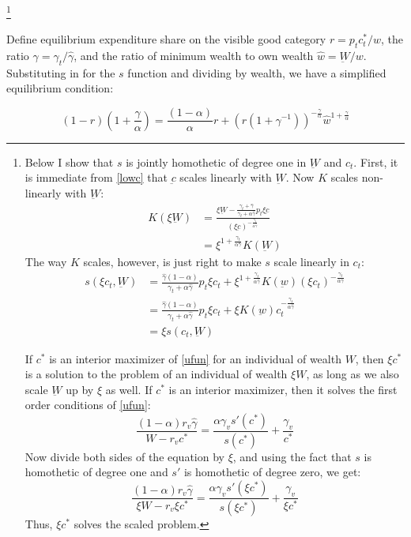 \documentclass[12pt]{article}
\begin{document}
\footnote{
Below I show that $s$ is jointly homothetic of degree one in $\underbar{W}$ and $c_t$.  First, it is immediate from \eqref{lowc} that $\underbar{c}$ scales linearly with $\underbar{W}$.
Now $K$ scales non-linearly with $\underbar{W}$:
\begin{align*}
	K(\xi\underbar{W}) &= \frac{\xi\underbar{W}- \frac{\gamma_t + \hat{\gamma}}{\gamma_t + \alpha \hat{\gamma}}p_t \xi \underbar{c}}{(\xi\underbar{c})^{-\frac{\gamma_t}{\alpha \hat{\gamma}}}} \\
	&= \xi^{1 + \frac{\gamma_t}{\alpha \hat{\gamma}}}K(\underbar{W})
\end{align*}
The way $K$ scales, however, is just right to make $s$ scale linearly in $c_t$:
\begin{align*}
	s(\xi c_t,\underbar{W}) &= \frac{\hat{\gamma}\left(1-\alpha\right)}{\gamma_t +\alpha \hat{\gamma}} p_t \xi c_t + \xi^{1+\frac{\gamma_t}{\alpha \hat{\gamma}}} K(\underbar{w}) (\xi c_t)^{-\frac{\gamma_t}{\alpha \hat{\gamma}}} \\
	&= \frac{\hat{\gamma}\left(1-\alpha\right)}{\gamma_t +\alpha \hat{\gamma}} p_t \xi c_t + \xi K(\underbar{w}) c_t^{-\frac{\gamma_t}{\alpha \hat{\gamma}}} \\
	&= \xi s(c_t,\underbar{W})
\end{align*}

If $c^*$ is an interior maximizer of \eqref{ufun} for an individual of wealth $W$, then $\xi c^*$ is a solution to the  problem of an individual of wealth $\xi W$, as long as we also scale $\underbar{W}$ up by $\xi$ as well.
If $c^*$ is an interior maximizer, then it solves the first order conditions of \eqref{ufun}:
\[
\frac{(1-\alpha)r_v \hat{\gamma}}{W-r_v c^*} = \frac{\alpha \gamma_v s'(c^*)}{s(c^*)} + \frac{\gamma_v}{c^*}
\]
Now divide both sides of the equation by $\xi$, and using the fact that $s$ is homothetic of degree one and $s'$ is homothetic of degree zero, we get:
\[
\frac{(1-\alpha)r_v \hat{\gamma}}{\xi W-r_v \xi c^*} = \frac{\alpha \gamma_v s'(\xi c^*)}{s(\xi c^*)} + \frac{\gamma_v}{\xi c^*}
\]
Thus, $\xi c^*$ solves the scaled problem.
}

Define equilibrium expenditure share on the visible good category $r = p_t c_t^* / w$, the ratio $\gamma = \gamma_t / \hat{\gamma}$, and the ratio of minimum wealth to own wealth $\hat{w} = \underbar{W} / w$.  Substituting in for the $s$ function and dividing by wealth, we have a simplified equilibrium condition:

\begin{equation}
	\label{eq:eq_cond}
    (1 - r)(1 + \frac{\gamma}{\alpha}) = \frac{\left(1-\alpha\right)}{\alpha} r +  \left(r\left(1 + \gamma^{-1}\right)\right)^{-\frac{\gamma}{\alpha}}\hat{w}^{1+\frac{\gamma}{\alpha}}
\end{equation}
\end{document}

